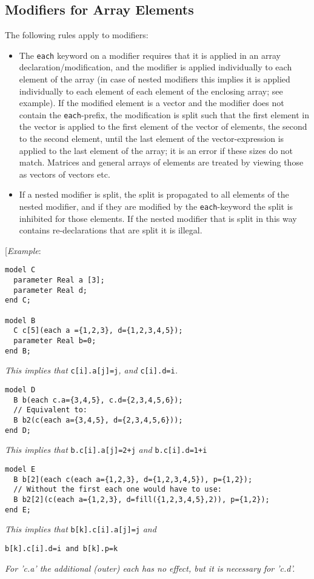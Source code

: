 \subsection{Modifiers for Array Elements}

The following rules apply to modifiers:

\begin{itemize}
\item
  The \lstinline!each! keyword on a modifier requires that it is applied in an array
  declaration/modification, and the modifier is applied individually to
  each element of the array (in case of nested modifiers this implies it
  is applied individually to each element of each element of the
  enclosing array; see example). If the modified element is a vector and
  the modifier does not contain the \lstinline!each!-prefix, the modification is
  split such that the first element in the vector is applied to the
  first element of the vector of elements, the second to the second
  element, until the last element of the vector-expression is applied to
  the last element of the array; it is an error if these sizes do not
  match. Matrices and general arrays of elements are treated by viewing
  those as vectors of vectors etc.
\item
  If a nested modifier is split, the split is propagated to all elements
  of the nested modifier, and if they are modified by the \lstinline!each!-keyword
  the split is inhibited for those elements. If the nested modifier that
  is split in this way contains re-declarations that are split it is
  illegal.
\end{itemize}

{[}\emph{Example}:
\begin{lstlisting}[language=modelica]
model C
  parameter Real a [3];
  parameter Real d;
end C;

model B
  C c[5](each a ={1,2,3}, d={1,2,3,4,5});
  parameter Real b=0;
end B;
\end{lstlisting}

\emph{This implies that} \lstinline!c[i].a[j]=j!\emph{, and}
\lstinline!c[i].d=i!\emph{.}
\begin{lstlisting}[language=modelica]
model D
  B b(each c.a={3,4,5}, c.d={2,3,4,5,6});
  // Equivalent to:
  B b2(c(each a={3,4,5}, d={2,3,4,5,6}));
end D;
\end{lstlisting}

\emph{This implies that} \lstinline!b.c[i].a[j]=2+j! \emph{and}
\lstinline!b.c[i].d=1+i!
\begin{lstlisting}[language=modelica]
model E
  B b[2](each c(each a={1,2,3}, d={1,2,3,4,5}), p={1,2});
  // Without the first each one would have to use:
  B b2[2](c(each a={1,2,3}, d=fill({1,2,3,4,5},2)), p={1,2});
end E;
\end{lstlisting}
\emph{This implies that} \lstinline!b[k].c[i].a[j]=j! \emph{and}
\begin{lstlisting}[language=modelica]
  b[k].c[i].d=i and b[k].p=k
\end{lstlisting}
\emph{For 'c.a' the additional (outer) each has no effect, but it is
necessary for 'c.d'.}

